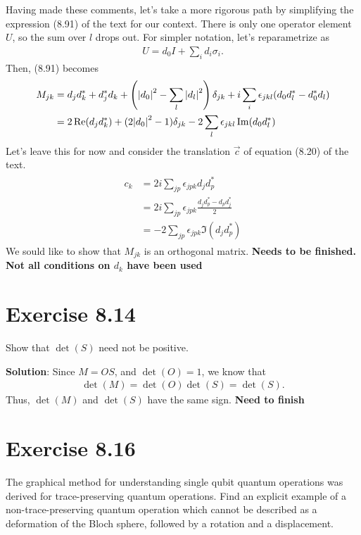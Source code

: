 \documentclass{book}
\begin{document}
    Having made these comments, let's take a more rigorous path by simplifying the expression (8.91) of the text for our context. There is only one operator element $U$, so the sum over $l$ drops out. For simpler notation, let's reparametrize as 
    \begin{align}
        U = d_0 I + \sum_i d_i \sigma_i.
    \end{align}
    Then, (8.91) becomes
    \begin{align}
    \begin{aligned}
        M_{jk} &= d_j d_k^* + d_j^* d_k + \left(\abs{d_0}^2 - \sum_l \abs{d_l}^2\right) \delta_{jk} + i \sum_i \epsilon_{jkl}(d_0 d_l^* - d_0^* d_l) \\
        &=2 \Re(d_j d_k^*) + (2 \abs{d_0}^2 -1)\delta_{jk} - 2 \sum_l \epsilon_{jkl} \Im (d_0 d_l^*)
    \end{aligned}
    \end{align}
    Let's leave this for now and consider the translation $\vec{c}$ of equation (8.20) of the text.
    \begin{align}
    \begin{aligned}
        c_k &= 2i \sum_{jp} \epsilon_{jpk} d_j d_p^* \\
        &= 2i \sum_{jp} \epsilon_{jpk} \frac{d_j d_p^* - d_p d_j^*}{2} \\
        &= - 2 \sum_{jp} \epsilon_{jpk} \Im(d_j d_p^*)
    \end{aligned}
    \end{align}
    We sould like to show that $M_{jk}$ is an orthogonal matrix. \textbf{Needs to be finished. Not all conditions on $d_k$ have been used}

\section*{Exercise 8.14}
    Show that $\det(S)$ need not be positive.

    \textbf{Solution}: Since $M = O S$, and $\det(O) = 1$, we know that
    \begin{align}
        \det(M) = \det(O) \det(S) = \det(S).
    \end{align}
    Thus, $\det(M)$ and $\det(S)$ have the same sign. \textbf{Need to finish}

\section{Exercise 8.16}
    The graphical method for understanding single qubit quantum operations was derived for trace-preserving quantum operations. Find an explicit example of a non-trace-preserving quantum operation which cannot be described as a deformation of the Bloch sphere, followed by a rotation and a displacement.
\end{document}
